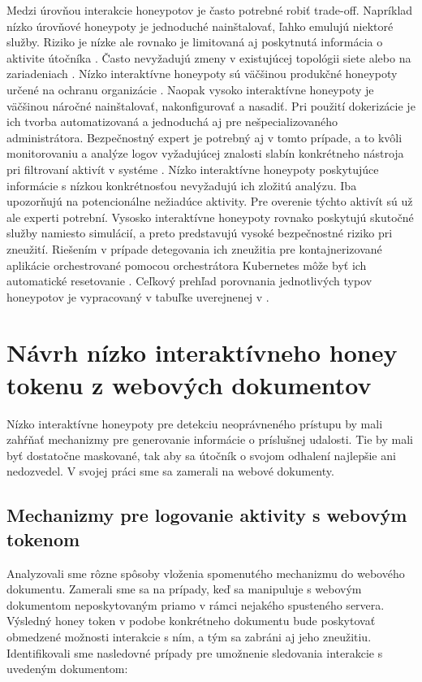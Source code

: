 \documentclass[conference, 11pt,slovak,a4paper,twoside]{IEEEtran}
\begin{document}
Medzi úrovňou interakcie honeypotov je často potrebné robiť trade-off. Napríklad nízko úrovňové honeypoty je jednoduché nainštalovať, ľahko emulujú niektoré služby. Riziko je nízke ale rovnako je limitovaná aj poskytnutá informácia o aktivite útočníka \cite{spitzner_honeypots_2002}. Často nevyžadujú zmeny v existujúcej topológii siete alebo na zariadeniach \cite{scada_2014}. Nízko interaktívne honeypoty sú väčšinou produkčné honeypoty určené na ochranu organizácie \cite{spitzner_honeypots_2002}. Naopak vysoko interaktívne honeypoty je väčšinou náročné nainštalovať, nakonfigurovať a nasadiť. Pri použití dokerizácie je ich tvorba automatizovaná a jednoduchá aj pre nešpecializovaného administrátora. Bezpečnostný expert je potrebný aj v tomto prípade, a to kvôli monitorovaniu a analýze logov vyžadujúcej znalosti slabín konkrétneho nástroja pri filtrovaní aktivít v systéme \cite{valicek_creation_2017}. Nízko interaktívne honeypoty poskytujúce informácie s nízkou konkrétnosťou nevyžadujú ich zložitú analýzu. Iba upozorňujú na potencionálne nežiadúce aktivity. Pre overenie týchto aktivít sú už ale experti potrební. Vysosko interaktívne honeypoty rovnako poskytujú skutočné služby namiesto simulácií, a preto predstavujú vysoké bezpečnostné riziko pri zneužití. Riešením v prípade detegovania ich zneužitia pre kontajnerizované aplikácie orchestrované pomocou orchestrátora Kubernetes môže byť ich automatické resetovanie \cite{reti_escape_2021}. Ceľkový prehľad porovnania jednotlivých typov honeypotov je vypracovaný v tabuľke uverejnenej v \cite{nagpal_catch_2015}. 



\section{Návrh nízko interaktívneho honey tokenu z webových dokumentov}

Nízko interaktívne honeypoty pre detekciu neoprávneného prístupu by mali zahŕňať mechanizmy pre generovanie informácie o príslušnej udalosti. Tie by mali byť dostatočne maskované, tak aby sa útočník o svojom odhalení najlepšie ani nedozvedel. V svojej práci sme sa zamerali na webové dokumenty. 


\subsection{Mechanizmy pre logovanie aktivity s webovým tokenom}

Analyzovali sme rôzne spôsoby vloženia spomenutého mechanizmu do webového dokumentu. Zamerali sme sa na prípady, keď sa manipuluje s webovým dokumentom neposkytovaným priamo v rámci nejakého spusteného servera. Výsledný honey token v podobe konkrétneho dokumentu bude poskytovať obmedzené možnosti interakcie s ním, a tým sa zabráni aj jeho zneužitiu. Identifikovali sme nasledovné prípady pre umožnenie sledovania interakcie s uvedeným dokumentom:
\end{document}
